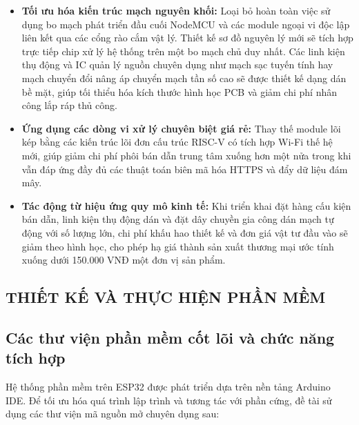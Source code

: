 \documentclass[12pt, a4paper, oneside]{article}
\begin{document}
\begin{itemize}
    \item \textbf{Tối ưu hóa kiến trúc mạch nguyên khối:} Loại bỏ hoàn toàn việc sử dụng bo mạch phát triển đầu cuối NodeMCU và các module ngoại vi độc lập liên kết qua các cổng rào cắm vật lý. Thiết kế sơ đồ nguyên lý mới sẽ tích hợp trực tiếp chip xử lý hệ thống trên một bo mạch chủ duy nhất. Các linh kiện thụ động và IC quản lý nguồn chuyên dụng như mạch sạc tuyến tính hay mạch chuyển đổi nâng áp chuyển mạch tần số cao sẽ được thiết kế dạng dán bề mặt, giúp tối thiểu hóa kích thước hình học PCB và giảm chi phí nhân công lắp ráp thủ công.
    \item \textbf{Ứng dụng các dòng vi xử lý chuyên biệt giá rẻ:} Thay thế module lõi kép bằng các kiến trúc lõi đơn cấu trúc RISC-V có tích hợp Wi-Fi thế hệ mới, giúp giảm chi phí phôi bán dẫn trung tâm xuống hơn một nửa trong khi vẫn đáp ứng đầy đủ các thuật toán biên mã hóa HTTPS và đẩy dữ liệu đám mây.
    \item \textbf{Tác động từ hiệu ứng quy mô kinh tế:} Khi triển khai đặt hàng cấu kiện bán dẫn, linh kiện thụ động dán và đặt dây chuyền gia công dán mạch tự động với số lượng lớn, chi phí khấu hao thiết kế và đơn giá vật tư đầu vào sẽ giảm theo hình học, cho phép hạ giá thành sản xuất thương mại ước tính xuống dưới 150.000 VNĐ một đơn vị sản phẩm.
\end{itemize}

\newpage
\begin{center}
    \section{THIẾT KẾ VÀ THỰC HIỆN PHẦN MỀM}
\end{center}
\subsection{Các thư viện phần mềm cốt lõi và chức năng tích hợp}
Hệ thống phần mềm trên ESP32 được phát triển dựa trên nền tảng Arduino IDE. Để tối ưu hóa quá trình lập trình và tương tác với phần cứng, đề tài sử dụng các thư viện mã nguồn mở chuyên dụng sau:
\end{document}
